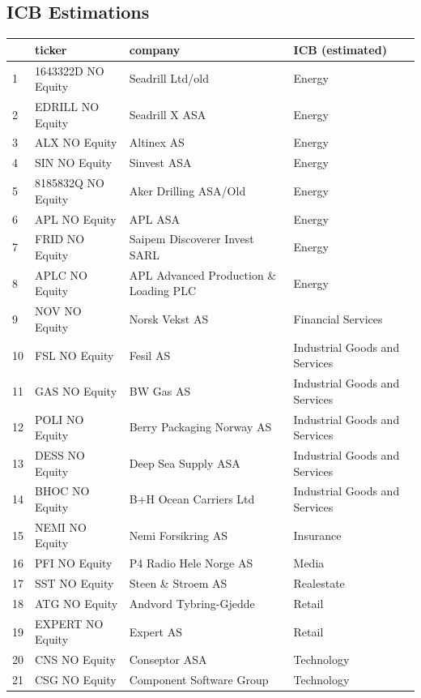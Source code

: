 \begin{appendices}
\section{ICB Estimations}
\label{APPENDIX From GICS to ICB}
\vspace{-1em}
\begin{table}[H]
\centering
\footnotesize
\begin{tabularx}{\textwidth}{lXXX}
\hline
 & ticker & company & ICB (estimated) \\ 
\hline
1 & 1643322D NO Equity & Seadrill Ltd/old & Energy \\ 
2 & EDRILL NO Equity & Seadrill X ASA & Energy \\ 
3 & ALX NO Equity & Altinex AS & Energy \\ 
4 & SIN NO Equity & Sinvest ASA & Energy \\ 
5 & 8185832Q NO Equity & Aker Drilling ASA/Old & Energy \\ 
6 & APL NO Equity & APL ASA & Energy \\ 
7 & FRID NO Equity & Saipem Discoverer Invest SARL & Energy \\ 
8 & APLC NO Equity & APL Advanced Production \& Loading PLC & Energy \\ 
9 & NOV NO Equity & Norsk Vekst AS & Financial Services \\ 
10 & FSL NO Equity & Fesil AS & Industrial Goods and Services \\ 
11 & GAS NO Equity & BW Gas AS & Industrial Goods and Services \\ 
12 & POLI NO Equity & Berry Packaging Norway AS & Industrial Goods and Services \\ 
13 & DESS NO Equity & Deep Sea Supply ASA & Industrial Goods and Services \\ 
14 & BHOC NO Equity & B+H Ocean Carriers Ltd & Industrial Goods and Services \\ 
15 & NEMI NO Equity & Nemi Forsikring AS & Insurance \\ 
16 & PFI NO Equity & P4 Radio Hele Norge AS & Media \\ 
17 & SST NO Equity & Steen \& Stroem AS & Realestate \\ 
18 & ATG NO Equity & Andvord Tybring-Gjedde & Retail \\ 
19 & EXPERT NO Equity & Expert AS & Retail \\ 
20 & CNS NO Equity & Conseptor ASA & Technology \\ 
21 & CSG NO Equity & Component Software Group & Technology \\ 

\end{tabularx}
\end{table}
\end{appendices}
